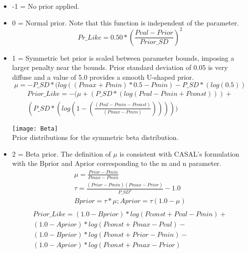 \begin{itemize}
	\item -1 = No prior applied.
	\item  0 = Normal prior. Note that this function is independent of the parameter.
	\begin{equation}
		Pr\_Like = 0.50*(\frac{Pval - Prior}{Prior\_SD})^2
	\end{equation}
	\item  1 = Symmetric bet prior is scaled between parameter bounds, imposing a larger penalty near the bounds.  Prior standard deviation of 0.05 is very diffuse and a value of 5.0 provides a smooth U-shaped prior.
	\begin{equation}  \mu = -P\_SD*(log((Pmax+Pmin)*0.5-Pmin)-P\_SD*(log(0.5)) \end{equation}
	\begin{equation}
		\begin{split}
			Prior\_Like = -(\mu + (P\_SD*(log(Pval-Pmin+Pconst))) + \\
			(P\_SD*(log(1-(\frac{(Pval-Pmin-Pconst)}{(Pmax-Pmin)})))))
		\end{split}
	\end{equation}

	\begin{center}
			\texttt{[image: Beta]}\\
			Prior distributions for the symmetric beta distribution.
	\end{center}

	\item 2 = Beta prior.  The definition of $\mu$ is consistent with CASAL's formulation with the Bprior and Aprior corresponding to the m and n parameter.
	\begin{equation}
		\begin{split}
			\mu = \frac{Prior-Pmin}{Pmax-Pmin} \\
			\tau  = \frac{(Prior-Pmin)(Pmax-Prior)}{P\_SD^2}-1.0\\
			Bprior  = \tau*\mu; Aprior = \tau (1.0-\mu)\\
		\end{split}
	\end{equation}
		\begin{equation}
		\begin{split}
		Prior\_Like = (1.0-Bprior)*log(Pconst+Pval-Pmin) + \\
		(1.0-Aprior)*log(Pconst+Pmax-Pval) - \\
		(1.0-Bprior)*log(Pconst + Prior - Pmin) - \\
		(1.0-Aprior)*log(Pconst + Pmax - Prior)
		\end{split}
	\end{equation}


\end{itemize}
